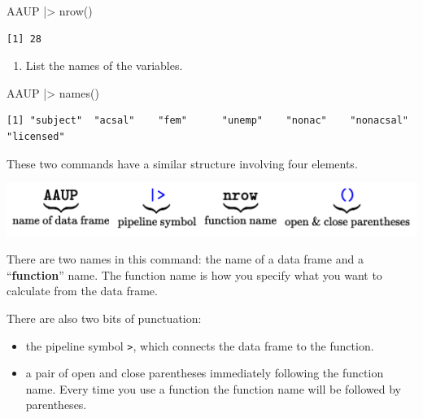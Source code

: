 \documentclass[
  letterpaper,
  DIV=11,
  numbers=noendperiod,
  oneside]{scrartcl}
\newenvironment{Shaded}{\begin{snugshade}}{\end{snugshade}}
\newcommand{\FunctionTok}[1]{\textcolor[rgb]{0.28,0.35,0.67}{#1}}
\newcommand{\NormalTok}[1]{\textcolor[rgb]{0.00,0.23,0.31}{#1}}
\newcommand{\SpecialCharTok}[1]{\textcolor[rgb]{0.37,0.37,0.37}{#1}}
\providecommand{\tightlist}{%
  \setlength{\itemsep}{0pt}\setlength{\parskip}{0pt}}\usepackage{longtable,booktabs,array}
\begin{document}
\begin{Shaded}
\begin{Highlighting}[]
\NormalTok{AAUP }\SpecialCharTok{|\textgreater{}} \FunctionTok{nrow}\NormalTok{()}
\end{Highlighting}
\end{Shaded}

\begin{verbatim}
[1] 28
\end{verbatim}

\begin{enumerate}
\def\labelenumi{\arabic{enumi}.}
\setcounter{enumi}{1}
\tightlist
\item
  List the names of the variables.
\end{enumerate}

\begin{Shaded}
\begin{Highlighting}[]
\NormalTok{AAUP }\SpecialCharTok{|\textgreater{}} \FunctionTok{names}\NormalTok{()}
\end{Highlighting}
\end{Shaded}

\begin{verbatim}
[1] "subject"  "acsal"    "fem"      "unemp"    "nonac"    "nonacsal" "licensed"
\end{verbatim}

These two commands have a similar structure involving four elements.

\includegraphics{www/latex-image-pipe.png}

There are two names in this command: the name of a data frame and a
``\textbf{function}'' name. The function name is how you specify what
you want to calculate from the data frame.

There are also two bits of punctuation:

\begin{itemize}
\item
  the pipeline symbol \texttt{\textbar{}\textgreater{}}, which connects
  the data frame to the function.
\item
  a pair of open and close parentheses immediately following the
  function name. Every time you use a function the function name will be
  followed by parentheses.
\end{itemize}
\end{document}

